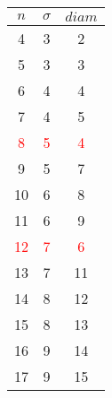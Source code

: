 \begin{tabular}{|c|c|c|}
    \hline
    $n$ & $\sigma$ & $diam$ \\
    \hline
    4 & 3 & 2 \\
    \hline
    5 & 3 & 3 \\
    \hline
    6 & 4 & 4 \\
    \hline
    7 & 4 & 5 \\
    \hline
    \textcolor{red}{8} & \textcolor{red}{5} & \textcolor{red}{4} \\
    \hline
    9 & 5 & 7 \\
    \hline
    10 & 6 & 8 \\
    \hline
    11 & 6 & 9 \\
    \hline
    \textcolor{red}{12} & \textcolor{red}{7} & \textcolor{red}{6} \\
    \hline
    13 & 7 & 11 \\
    \hline
    14 & 8 & 12 \\
    \hline
    15 & 8 & 13 \\
    \hline
    16 & 9 & 14 \\
    \hline
    17 & 9 & 15 \\
    \hline
\end{tabular}